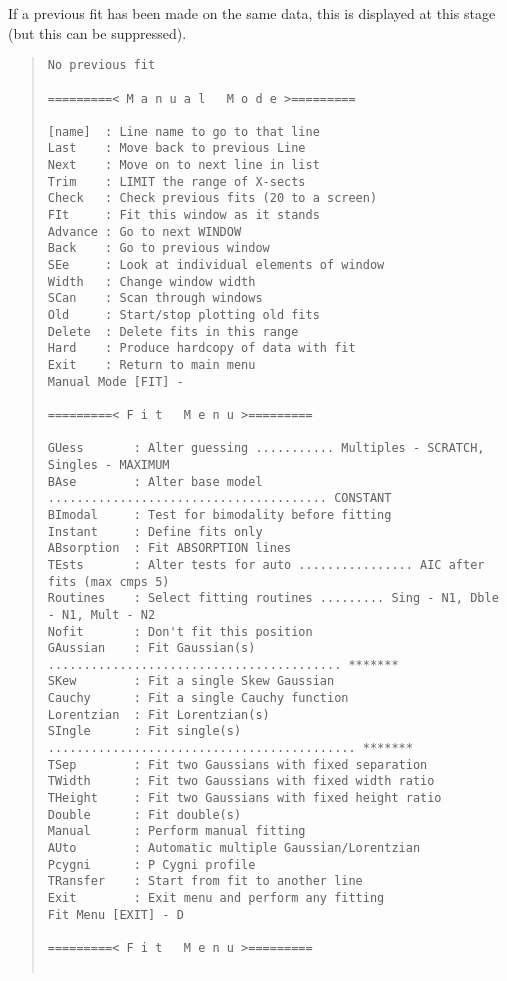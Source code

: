 If a previous fit has been made on the same data, this is displayed
at this stage (but this can be suppressed).
\begin{quote}\begin{verbatim}
No previous fit
 
=========< M a n u a l   M o d e >=========
 
[name]  : Line name to go to that line
Last    : Move back to previous Line
Next    : Move on to next line in list
Trim    : LIMIT the range of X-sects
Check   : Check previous fits (20 to a screen)
FIt     : Fit this window as it stands
Advance : Go to next WINDOW
Back    : Go to previous window
SEe     : Look at individual elements of window
Width   : Change window width
SCan    : Scan through windows
Old     : Start/stop plotting old fits
Delete  : Delete fits in this range
Hard    : Produce hardcopy of data with fit
Exit    : Return to main menu
Manual Mode [FIT] -
 
=========< F i t   M e n u >=========
 
GUess       : Alter guessing ........... Multiples - SCRATCH, Singles - MAXIMUM
BAse        : Alter base model ....................................... CONSTANT
BImodal     : Test for bimodality before fitting
Instant     : Define fits only
ABsorption  : Fit ABSORPTION lines
TEsts       : Alter tests for auto ................ AIC after fits (max cmps 5)
Routines    : Select fitting routines ......... Sing - N1, Dble - N1, Mult - N2
Nofit       : Don't fit this position
GAussian    : Fit Gaussian(s) ......................................... *******
SKew        : Fit a single Skew Gaussian
Cauchy      : Fit a single Cauchy function
Lorentzian  : Fit Lorentzian(s)
SIngle      : Fit single(s) ........................................... *******
TSep        : Fit two Gaussians with fixed separation
TWidth      : Fit two Gaussians with fixed width ratio
THeight     : Fit two Gaussians with fixed height ratio
Double      : Fit double(s)
Manual      : Perform manual fitting
AUto        : Automatic multiple Gaussian/Lorentzian
Pcygni      : P Cygni profile
TRansfer    : Start from fit to another line
Exit        : Exit menu and perform any fitting
Fit Menu [EXIT] - D
 
=========< F i t   M e n u >=========
 

\end{verbatim}
\end{quote}
